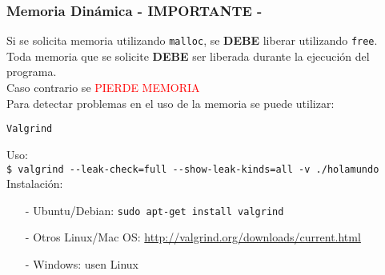 \documentclass[aspectratio=169]{beamer}
\begin{document}
\begin{frame}[fragile,t]
    \frametitle{Memoria Dinámica  \hspace{0.5cm}\huge - IMPORTANTE -}

    \normalsize
    Si se solicita memoria utilizando \texttt{malloc}, se \textbf{DEBE} liberar utilizando \texttt{free}.\\
    Toda memoria que se solicite \textbf{DEBE} ser liberada durante la ejecución del programa.\\
    \vspace{0.3cm}
    \pause
    Caso contrario se \hspace{0.03cm} \huge \textcolor{red}{PIERDE MEMORIA} \\
    \vspace{0.3cm}
    \pause
    \normalsize Para detectar problemas en el uso de la memoria se puede utilizar: \\
    \begin{center}
    \Huge \texttt{Valgrind}\\
    \end{center}
    \pause
    \normalsize \textcolor{verdeuca}{Uso:}\\
    \normalsize \verb|$ valgrind --leak-check=full --show-leak-kinds=all -v ./holamundo|\\
    \vspace{0.2cm}
    \normalsize \textcolor{verdeuca}{Instalación:}\\
    \begin{itemize}
    \item[-] Ubuntu/Debian: \texttt{sudo apt-get install valgrind}
    \item[-] Otros Linux/Mac OS: \url{http://valgrind.org/downloads/current.html}
    \item[-] Windows: \textcolor{naranjauca}{usen Linux}
    \end{itemize}
\end{frame}
\end{document}
